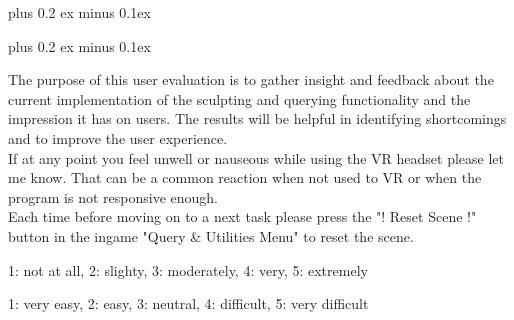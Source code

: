 \parindent0pt
\parskip5pt plus 0.2 ex minus 0.1ex


\def\<#1>{\textsc{#1}}
\parindent0pt
\parskip5pt plus 0.2 ex minus 0.1ex

% 

The purpose of this user evaluation is to gather insight and feedback about the current implementation
of the sculpting and querying functionality and the impression it has on users. The results will be
helpful in identifying shortcomings and to improve the user experience.\\ \hfill
If at any point you feel unwell or nauseous while using the VR headset please let me know. That can be a common reaction when not used
to VR or when the program is not responsive enough.\\ \hfill
Each time before moving on to a next task please press the "! Reset Scene !" button in the ingame "Query \& Utilities Menu" to reset the scene.



\hfill \break
{}

1: not at all, 2: slighty, 3: moderately, 4: very, 5: extremely \newline





\newpage
{}

1: very easy, 2: easy, 3: neutral, 4: difficult, 5: very difficult \newline

